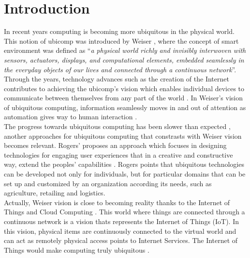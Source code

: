 \section{Introduction}
\label{sec:introduction}
In recent years computing is becoming more ubiquitous in the physical world. This notion of ubicomp was introduced by Weiser \cite{weiser1999origins}, where the concept of
smart environment was defined as ``\textit{a physical world richly and invisibly interwoven with sensors, actuators, displays, and computational elements, embedded seamlessly in the everyday
objects of our lives and connected through a continuous network}''. Through the years, technology advances such as the creation of the Internet contributes to achieving the ubicomp's vision
which enables individual devices to communicate between themselves from any part of the world \cite{gubbi2013internet}. In Weiser's vision of ubiquitous computing, information seamlessly moves
in and out of attention as automation gives way to human interaction \cite{weiser1991computer}.\\

The progress towards ubiquitous computing has been slower than expected \cite{greenfield2010everyware}, another approaches for ubiquitous computing that constrasts with Weiser vision becomes relevant.
Rogers' proposes an approach which focuses in designing technologies for engaging user experiences that in a creative and constructive way, extend the peoples' capabilities \cite{rogers2006moving}.
Rogers points that ubiquitous technologies can be developed not only for individuals, but for particular domains that can be set up and customized by an organization according its needs, such as
agriculture, retailing and logistics.\\

Actually, Weiser vision is close to becoming reality thanks to the Internet of Things and Cloud Computing \cite{caceres2012ubicomp}. This world where things are connected through a continuous network
is a vision thats represents the Internet of Things (IoT). In this vision, physical items are continuously connected to the virtual world and can act as remotely physical access points to Internet Services.
The Internet of Things would make computing truly ubiquitous \cite{mattern2010internet}.\\

